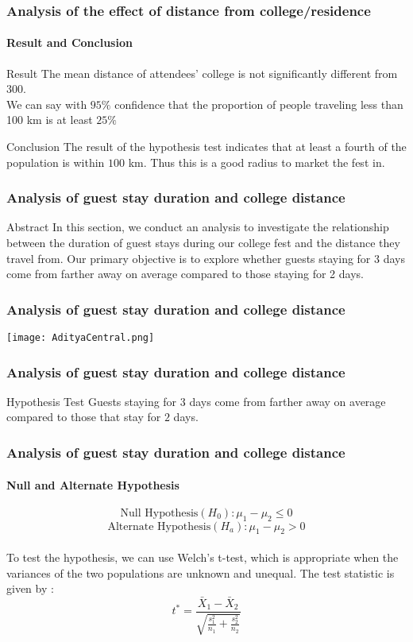 \documentclass{beamer}
\begin{document}
\begin{frame}
\frametitle{Analysis of the effect of distance
from college/residence}
\framesubtitle{Result and Conclusion}
\begin{block}{Result}
The mean distance of attendees' college is not significantly different from 300.\\We can say with $95\%$ confidence that the proportion of people traveling less than 100 km is at least $25\%$
\end{block}

\begin{block}{Conclusion}
The result of the hypothesis test indicates that at least a fourth of the population is within $100$ km. Thus this is a good radius to market the fest in.
\end{block}
\end{frame}

\begin{frame}
\frametitle{Analysis of guest stay duration and college distance}
\begin{block}{Abstract}
In this section, we conduct an analysis to investigate the relationship between the duration of guest stays during our college fest and the distance they travel from. Our primary objective is to explore whether guests staying for 3 days come from farther away on average compared to those staying for 2 days.
\end{block}
\end{frame}

\begin{frame}
\frametitle{Analysis of guest stay duration and college distance}
\begin{minipage}{\textwidth}
    \centering
    \texttt{[image: AdityaCentral.png]}
    \label{fig:enter-label}
\end{minipage}
\end{frame}

\begin{frame}
\frametitle{Analysis of guest stay duration and college distance}
\begin{block}{Hypothesis Test}
Guests staying for $3$ days come from farther away on average compared to those that stay for $2$ days.
\end{block}
\end{frame}

\begin{frame}
\frametitle{Analysis of guest stay duration and college distance}
\framesubtitle{Null and Alternate Hypothesis}
$$\text{Null Hypothesis}(H_0): \mu_1 - \mu_2 \le 0 $$
$$\text{Alternate Hypothesis}(H_a): \mu_1 - \mu_2 > 0$$  \\
\vspace{5mm}
To test the hypothesis, we can use Welch’s t-test, which is appropriate when the variances of the two populations are unknown and unequal. The test statistic is given by :
\[ t^* = \frac{\bar{X}_1 - \bar{X}_2}{\sqrt{\frac{s_1^2}{n_1} + \frac{s_2^2}{n_2}}} \]
\end{frame}
\end{document}

